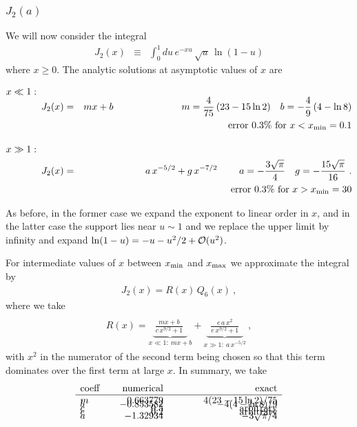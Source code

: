 \documentclass[preprint,12pt,eqsecnum,nofootinbib,amsmath,amssymb]{revtex4}
\begin{document}
\subsubsection{$J_2(a)$}

We will now consider the integral
\begin{eqnarray}
  J_2(x) &\equiv&
  \int_0^1 du\,e^{-x u} \, \sqrt{u}\, 
  \ln(1-u)
\end{eqnarray}
where $x \ge 0$. The analytic solutions at asymptotic
values of $x$ are

\vbox{
\begin{eqnarray}
\nonumber
  x \ll 1: \hskip1cm &&
\\[-5pt]
  J_2(x) &=& m x + b 
  \hskip2.5cm
  m= \frac{4}{75}\,(23 - 15\ln2)
  ~~~ b=-\frac{4}{9}\,( 4 - \ln8) 
\\\nonumber &&
  \hskip-1.3cm {\rm error~} 0.3\% {\rm ~for~} x< x_{\rm min}=0.1
\\[10pt]
\nonumber
  x \gg 1: \hskip1cm &&
\\
  J_2(x) &=& a\,x^{-5/2} + g\,x^{-7/2} 
  \hskip0.8cm a = - \frac{3\sqrt{\pi}}{4}
  ~~~ g =  - \frac{15\sqrt{\pi}}{16} \ .
\\\nonumber &&
  \hskip-1.3cm {\rm error~} 0.3\% {\rm ~for~} x> x_{\rm min}=30
\end{eqnarray}
}

\noindent
As before, in the former case we expand the exponent to linear 
order in $x$, and in the latter case the support lies near 
$u \sim 1$ and we replace the upper limit by infinity and 
expand $\ln(1-u)=-u - u^2/2 + {\cal O}(u^2)$. 

For intermediate values of $x$ between $x_{\rm min}$ and
$x_{\rm max}$ we approximate the integral by
\begin{eqnarray}
  J_2(x) = R(x) \, Q_6(x) \ ,
\end{eqnarray}
where we take
\begin{eqnarray}
\\\nonumber
  R(x)= 
  \underbrace{~\frac{m x + b}{c\, x^{9/2} + 1}~~}_{x\ll 1:~mx+b}  + 
  \underbrace{~~\frac{e\, a\, x^2}{e\, x^{9/2} +1}~~}_{x\gg 1:~ 
  a\, x^{-5/2}}\ ,
\end{eqnarray}
with $x^2$ in the numerator of the second term being chosen
so that this term dominates over the first term at large $x$.
In summary, we take
\begin{eqnarray}
\begin{array}{lrr}
  {\rm coeff} ~~~ & {\rm numerical} & \hskip3cm {\rm exact}    \\ \hline
  m               &   0.663779            & 4(23 - 15\ln2)/75  \\[-8pt]
  b               &  -0.853582            & -4( 4 - \ln8)/9    \\[-8pt]
  c               &   0.5                 & {\rm arbitrary}    \\[-8pt]
  e               &   0.2                 & {\rm arbitrary}    \\[-8pt]
  a               &  -1.32934             & -3\sqrt{\pi}/4 
\end{array}
\end{eqnarray}
\end{document}
